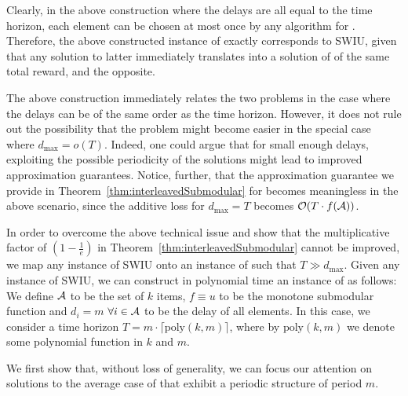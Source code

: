 Clearly, in the above construction where the delays are all equal to the time horizon, each element can be chosen at most once by any algorithm for \rsm. Therefore, the above constructed instance of \rsm exactly corresponds to SWIU, given that any solution to latter immediately translates into a solution of \rsm of the same total reward, and the opposite. 

The above construction immediately relates the two problems in the case where the delays can be of the same order as the time horizon. However, it does not rule out the possibility that the \rsm problem might become easier in the special case where $d_{\max} = o(T)$. Indeed, one could argue that for small enough delays, exploiting the possible periodicity of the \rsm solutions might lead to improved approximation guarantees. Notice, further, that the approximation guarantee we provide in Theorem~\ref{thm:interleavedSubmodular} for \IS becomes meaningless in the above scenario, since the additive loss for $d_{\max} = T$ becomes $\mathcal{O}(T\cdot f(\operatorname{\mathcal{A}}))$.


In order to overcome the above technical issue and show that the multiplicative factor of $\left(1 - \frac{1}{e}\right)$ in Theorem~\ref{thm:interleavedSubmodular} cannot be improved, we map any instance of SWIU onto an instance of \rsm such that $T \gg d_{\max}$. Given any instance of SWIU, we can construct in polynomial time an instance of \rsm as follows: We define $\operatorname{\mathcal{A}}$ to be the set of $k$ items, $f \equiv u$ to be the monotone submodular function and $d_i = m$ $\forall i \in \operatorname{\mathcal{A}}$ to be the delay of all elements. In this case, we consider a time horizon $T = m \cdot \lceil\text{poly}(k,m) \rceil$, where by $\text{poly}(k,m)$ we denote some polynomial function in $k$ and $m$. 

We first show that, without loss of generality, we can focus our attention on solutions to the average case of \rsm that exhibit a periodic structure of period $m$.

